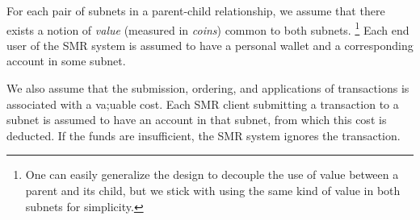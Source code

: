 For each pair of subnets in a parent-child relationship, we assume that there exists a notion of \emph{value} (measured in \emph{coins}) common to both subnets.%
\footnote{One can easily generalize the design to decouple the use of value between a parent and its child, but we stick with using the same kind of value in both subnets for simplicity.}
Each end user of the SMR system is assumed to have a personal wallet and a corresponding account in some subnet.

We also assume that the submission, ordering, and applications of transactions is associated with a va;uable cost.
Each SMR client submitting a transaction to a subnet is assumed to have an account in that subnet, from which this cost is deducted.
If the funds are insufficient, the SMR system ignores the transaction.